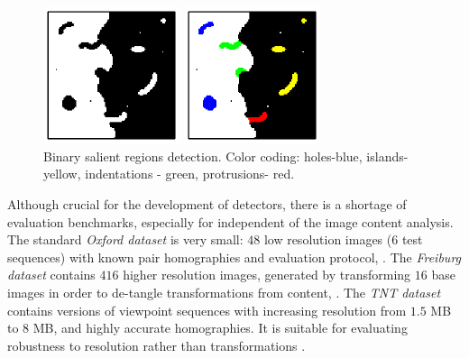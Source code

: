 \documentclass{article}
\begin{document}
\begin{figure}[htb]

\begin{minipage}[b]{.48\linewidth}
  \centering
  \centerline{\includegraphics[width=4.0cm]{./Figs/binary_marks}}

\end{minipage}
\begin{minipage}[b]{0.48\linewidth}
  \centering
  \centerline{\includegraphics[width=4.0cm]{./Figs/binary_marks_clean_color_coded}}

\end{minipage}
\vspace{-0.4cm}
\caption{Binary salient regions detection.
Color coding: holes-blue, islands- yellow,
indentations - green, protrusions- red. }
\label{fig:binary_sal}
\end{figure}
\vspace*{-0.1cm}


Although crucial for the development of detectors, there is a shortage of evaluation benchmarks, especially for independent of the image content analysis. The standard {\em Oxford dataset} is very small: $48$ low resolution images ($6$ test sequences) with known pair homographies and evaluation protocol, \cite{Mikolajczyk:2005}.  The {\em Freiburg dataset} contains $416$ higher resolution images, generated by transforming $16$ base images in order to de-tangle transformations from content, \cite{FischerDB14}.  
The {\em TNT dataset} contains versions of viewpoint sequences with increasing resolution from $1.5$ MB to $8$ MB, and highly accurate homographies. It is suitable for evaluating robustness to resolution rather than transformations \cite{CorRos2013}. 
\end{document}
